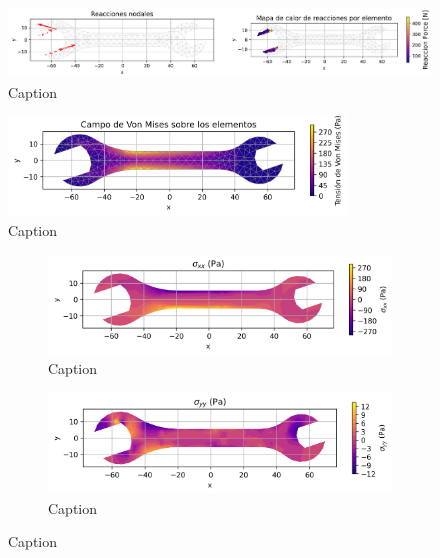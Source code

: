\documentclass{article}  %
\begin{document}
\begin{figure}[H]
  \centering
  \includegraphics[width=1\textwidth]{GRAFICOS/Case b_deformada_reacciones.png}
  \caption{Caption}
  \label{fig:principal}
\end{figure}

\begin{figure}[H]
  \centering
  \includegraphics[width=0.8\textwidth]{GRAFICOS/Case b_von_mises.png}
  \caption{Caption}
  \label{fig:principal}
\end{figure}

\begin{figure}[H]
  \centering
  \begin{subfigure}[t]{0.49\textwidth}
    \centering
    \includegraphics[width=\textwidth]{GRAFICOS/Case b - sigma_xx.png}
    \caption{Caption}
    \label{fig:deformada_reacciones}
  \end{subfigure}
  \hfill
  \begin{subfigure}[t]{0.49\textwidth}
    \centering
    \includegraphics[width=\textwidth]{GRAFICOS/Case b - sigma_yy.png}
    \caption{Caption}
    \label{fig:von_mises}
  \end{subfigure}
  \caption{Caption}
  \label{fig:analisis_estructural}
\end{figure}
\end{document}
